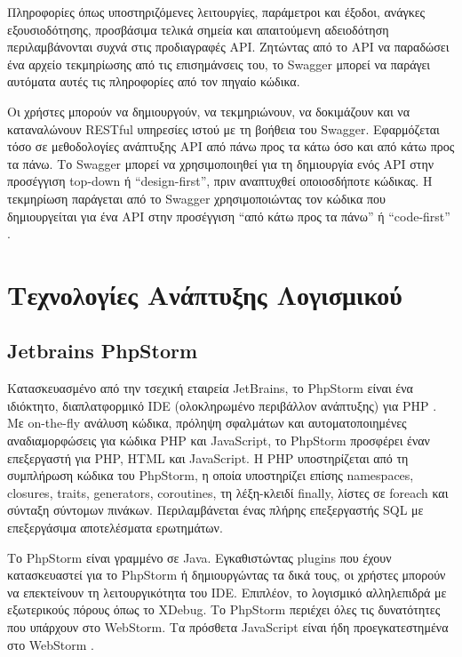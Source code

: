 Πληροφορίες όπως υποστηριζόμενες λειτουργίες, παράμετροι και έξοδοι, ανάγκες εξουσιοδότησης, προσβάσιμα τελικά σημεία και απαιτούμενη αδειοδότηση περιλαμβάνονται συχνά στις προδιαγραφές API. Ζητώντας από το API να παραδώσει ένα αρχείο τεκμηρίωσης από τις επισημάνσεις του, το Swagger μπορεί να παράγει αυτόματα αυτές τις πληροφορίες από τον πηγαίο κώδικα.

Οι χρήστες μπορούν να δημιουργούν, να τεκμηριώνουν, να δοκιμάζουν και να καταναλώνουν RESTful υπηρεσίες ιστού με τη βοήθεια του Swagger. Εφαρμόζεται τόσο σε μεθοδολογίες ανάπτυξης API από πάνω προς τα κάτω όσο και από κάτω προς τα πάνω. Το Swagger μπορεί να χρησιμοποιηθεί για τη δημιουργία ενός API στην προσέγγιση top-down ή ``design-first'', πριν αναπτυχθεί οποιοσδήποτε κώδικας. Η τεκμηρίωση παράγεται από το Swagger χρησιμοποιώντας τον κώδικα που δημιουργείται για ένα API στην προσέγγιση ``από κάτω προς τα πάνω'' ή ``code-first'' \cite{Swagger_2019}.

\filbreak
\section{Τεχνολογίες Ανάπτυξης Λογισμικού}

\subsection{Jetbrains PhpStorm}
Κατασκευασμένο από την τσεχική εταιρεία JetBrains, το PhpStorm είναι ένα ιδιόκτητο, διαπλατφορμικό IDE (ολοκληρωμένο περιβάλλον ανάπτυξης) για PHP \cite{grigorev2014string}. Με on-the-fly ανάλυση κώδικα, πρόληψη σφαλμάτων και αυτοματοποιημένες αναδιαμορφώσεις για κώδικα PHP και JavaScript, το PhpStorm προσφέρει έναν επεξεργαστή για PHP, HTML και JavaScript. Η PHP υποστηρίζεται από τη συμπλήρωση κώδικα του PhpStorm, η οποία υποστηρίζει επίσης namespaces, closures, traits, generators, coroutines, τη λέξη-κλειδί finally, λίστες σε foreach και σύνταξη σύντομων πινάκων. Περιλαμβάνεται ένας πλήρης επεξεργαστής SQL με επεξεργάσιμα αποτελέσματα ερωτημάτων.

Το PhpStorm είναι γραμμένο σε Java. Εγκαθιστώντας plugins που έχουν κατασκευαστεί για το PhpStorm ή δημιουργώντας τα δικά τους, οι χρήστες μπορούν να επεκτείνουν τη λειτουργικότητα του IDE. Επιπλέον, το λογισμικό αλληλεπιδρά με εξωτερικούς πόρους όπως το XDebug. Το PhpStorm περιέχει όλες τις δυνατότητες που υπάρχουν στο WebStorm. Τα πρόσθετα JavaScript είναι ήδη προεγκατεστημένα στο WebStorm \cite{PhpStorm_JetBrains}.

